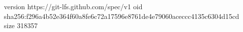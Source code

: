 version https://git-lfs.github.com/spec/v1
oid sha256:f296a4b52e364f60a8fe6c72a17596e8761de4e79060aceccc4135c6304d15cd
size 318357
